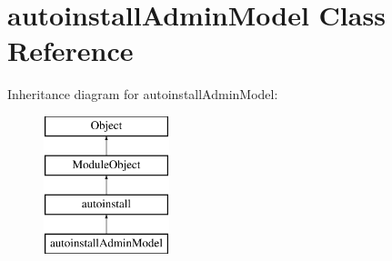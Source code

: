 \hypertarget{classautoinstallAdminModel}{\section{autoinstall\-Admin\-Model Class Reference}
\label{classautoinstallAdminModel}
}
Inheritance diagram for autoinstall\-Admin\-Model\-:\begin{figure}[H]
\begin{center}
\leavevmode
\includegraphics[height=4.000000cm]{classautoinstallAdminModel}
\end{center}
\end{figure}
